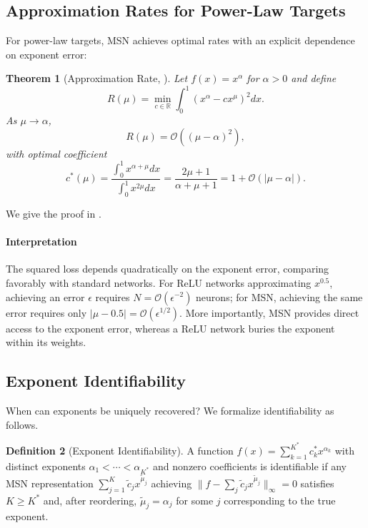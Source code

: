 \documentclass{article}
\theoremstyle{plain}
\newtheorem{theorem}{Theorem}[section]
\theoremstyle{definition}
\newtheorem{definition}[theorem]{Definition}
\theoremstyle{remark}
\newcommand{\R}{\mathbb{R}}
\newcommand{\mcO}{\mathcal{O}}
\begin{document}
\subsection{Approximation Rates for Power-Law Targets}

For power-law targets, MSN achieves optimal rates with an explicit dependence on exponent error:
\begin{theorem}[Approximation Rate, \cite{nguessan2025msn}]
	\label{thm:rate}
	Let $f(x) = x^\alpha$ for $\alpha > 0$ and define
	\begin{equation}
		R(\mu) = \min_{c \in \R} \int_0^1 (x^\alpha - c x^\mu)^2 dx.
	\end{equation}
	As $\mu \to \alpha$,
	\begin{equation}
		R(\mu) = \mcO((\mu - \alpha)^2),
	\end{equation}
	with optimal coefficient
	\begin{equation}
		c^*(\mu) = \frac{\int_0^1 x^{\alpha+\mu} dx}{\int_0^1 x^{2\mu} dx}
		= \frac{2\mu+1}{\alpha+\mu+1}
		= 1 + \mcO(|\mu - \alpha|).
	\end{equation}
\end{theorem}
We give the proof in .

\paragraph{Interpretation} The squared loss depends quadratically on the exponent error, comparing favorably with standard networks. For ReLU networks approximating $x^{0.5}$, achieving an error $\epsilon$ requires $N = \mcO(\epsilon^{-2})$ neurons; for MSN, achieving the same error requires only $|\mu - 0.5| = \mcO(\epsilon^{1/2})$. More importantly, MSN provides direct access to the exponent error, whereas a ReLU network buries the exponent within its weights.

\subsection{Exponent Identifiability}

When can exponents be uniquely recovered? We formalize identifiability as follows.
\begin{definition}[Exponent Identifiability]
	A function $f(x) = \sum_{k=1}^{K^*} c_k^* x^{\alpha_k}$ with distinct exponents $\alpha_1 < \cdots < \alpha_{K^*}$ and nonzero coefficients is identifiable if any MSN representation $\sum_{j=1}^K \tilde{c}_j x^{\tilde{\mu}_j}$ achieving $\|f - \sum_j \tilde{c}_j x^{\tilde{\mu}_j}\|_\infty = 0$ satisfies $K \geq K^*$ and, after reordering, $\tilde{\mu}_j = \alpha_j$ for some $j$ corresponding to the true exponent.
\end{definition}
\end{document}
